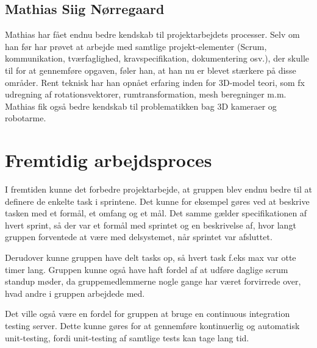 \subsection{Mathias Siig Nørregaard}
Mathias har fået endnu bedre kendskab til projektarbejdets processer. Selv om han før har prøvet at arbejde med samtlige projekt-elementer (Scrum, kommunikation, tværfaglighed, kravspecifikation, dokumentering osv.), der skulle til for at gennemføre opgaven, føler han, at han nu er blevet stærkere på disse områder. Rent teknisk har han opnået erfaring inden for 3D-model teori, som fx udregning af rotationsvektorer, rumtransformation, mesh beregninger m.m. Mathias fik også bedre kendskab til problematikken bag 3D kameraer og robotarme.

\section{Fremtidig arbejdsproces}
I fremtiden kunne det forbedre projektarbejde, at gruppen blev endnu bedre til at definere de enkelte task i sprintene. Det kunne for eksempel gøres ved at beskrive tasken med et formål, et omfang og et mål. Det samme gælder specifikationen af hvert sprint, så der var et formål med sprintet og en beskrivelse af, hvor langt gruppen forventede at være med delsystemet, når sprintet var afsluttet.

Derudover kunne gruppen have delt tasks op, så hvert task f.eks max var otte timer lang. Gruppen kunne også have haft fordel af at udføre daglige scrum standup møder, da gruppemedlemmerne nogle gange har været forvirrede over, hvad andre i gruppen arbejdede med.

Det ville også være en fordel for gruppen at bruge en continuous integration testing server. Dette kunne gøres for at gennemføre kontinuerlig og automatisk unit-testing, fordi unit-testing af samtlige tests kan tage lang tid.
